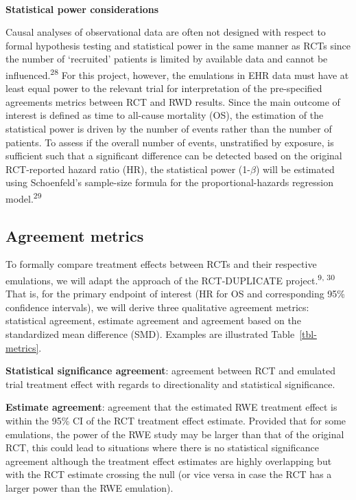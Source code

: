 \documentclass[
  letterpaper,
  DIV=11,
  numbers=noendperiod]{scrartcl}
\makeatletter
\let\oldparagraph\paragraph
\renewcommand{\paragraph}{
    \@ifstar
      \xxxParagraphStar
      \xxxParagraphNoStar
  }
\newcommand{\xxxParagraphStar}[1]{\oldparagraph*{#1}\mbox{}}
\newcommand{\xxxParagraphNoStar}[1]{\oldparagraph{#1}\mbox{}}
\makeatother
\begin{document}
\paragraph{\texorpdfstring{\textbf{Statistical power
considerations}}{Statistical power considerations}}\label{statistical-power-considerations}

Causal analyses of observational data are often not designed with
respect to formal hypothesis testing and statistical power in the same
manner as RCTs since the number of `recruited' patients is limited by
available data and cannot be influenced.\textsuperscript{28} For this
project, however, the emulations in EHR data must have at least equal
power to the relevant trial for interpretation of the pre-specified
agreements metrics between RCT and RWD results. Since the main outcome
of interest is defined as time to all-cause mortality (OS), the
estimation of the statistical power is driven by the number of events
rather than the number of patients. To assess if the overall number of
events, unstratified by exposure, is sufficient such that a significant
difference can be detected based on the original RCT-reported hazard
ratio (HR), the statistical power (1-\(\beta\)) will be estimated using
Schoenfeld's sample-size formula for the proportional-hazards regression
model.\textsuperscript{29}

\subsection{Agreement metrics}\label{sec-agreement-metrics}

To formally compare treatment effects between RCTs and their respective
emulations, we will adapt the approach of the RCT-DUPLICATE
project.\textsuperscript{9, 30} That is, for the primary endpoint of
interest (HR for OS and corresponding 95\% confidence intervals), we
will derive three qualitative agreement metrics: statistical agreement,
estimate agreement and agreement based on the standardized mean
difference (SMD). Examples are illustrated Table~\ref{tbl-metrics}.

\textbf{Statistical significance agreement}: agreement between RCT and
emulated trial treatment effect with regards to directionality and
statistical significance.

\textbf{Estimate agreement}: agreement that the estimated RWE treatment
effect is within the 95\% CI of the RCT treatment effect estimate.
Provided that for some emulations, the power of the RWE study may be
larger than that of the original RCT, this could lead to situations
where there is no statistical significance agreement although the
treatment effect estimates are highly overlapping but with the RCT
estimate crossing the null (or vice versa in case the RCT has a larger
power than the RWE emulation).
\end{document}
